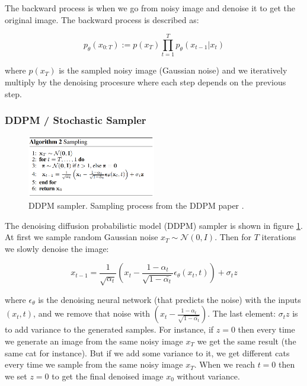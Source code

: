 The backward process is when we go from noisy image and denoise it to get the original image. The backward process is described as:

\[ p_\theta (x_{0:T}) := p(x_T) \prod_{t=1}^{T} p_\theta (x_{t-1} | x_t) \]

where $p(x_T)$ is the sampled noisy image (Gaussian noise) and we iteratively multiply by the denoising procesure where each step depends on the previous step.









\subsubsection{DDPM / Stochastic Sampler}

\begin{figure}
    \centering
    \includegraphics[width=0.5\textwidth]{images/appendix/dm_samplers/ddpm.png}
    \caption{DDPM sampler. Sampling process from the DDPM paper \cite{ddpm}.}
    \label{fig:appendix_ddpm_sampling}
\end{figure}

The denoising diffusion probabilistic model (DDPM) sampler is shown in figure \ref{fig:appendix_ddpm_sampling}. At first we sample random Gaussian noise $x_T \sim \mathcal{N} (0, I)$. Then for $T$ iterations we slowly denoise the image:

\[ x_{t-1} = \frac{1}{\sqrt{\alpha_t}} \left( x_t - \frac{1 - \alpha_t}{\sqrt{1 - \bar{\alpha_t}}} \epsilon_\theta (x_t, t) \right) + \sigma_t z \]

where $\epsilon_\theta$ is the denoising neural network (that predicts the noise) with the inputs $(x_t, t)$, and we remove that noise with $\left( x_t - \frac{1 - \alpha_t}{\sqrt{1 - \bar{\alpha_t}}} \right)$. The last element: $\sigma_t z$ is to add variance to the generated samples. For instance, if $z=0$ then every time we generate an image from the same noisy image $x_T$ we get the same result (the same cat for instance). But if we add some variance to it, we get different cats every time we sample from the same noisy image $x_T$. When we reach $t=0$ then we set $z=0$ to get the final denoised image $x_0$ without variance.







